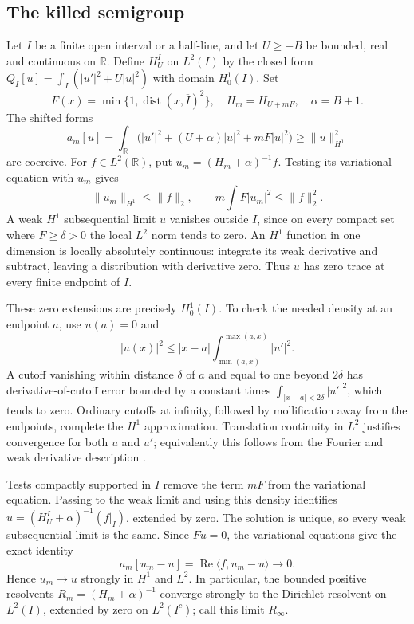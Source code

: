 \documentclass[11pt,a4paper]{article}
\newcommand{\R}{\mathbb R}
\begin{document}
\subsection*{The killed semigroup}
Let $I$ be a finite open interval or a half-line, and let $U\geq-B$ be
bounded, real and continuous on $\R$. Define $H_U^I$ on $L^2(I)$ by the
closed form $Q_I[u]=\int_I(|u'|^2+U|u|^2)$ with domain $H^1_0(I)$.
Set
\[
 F(x)=\min\{1,\operatorname{dist}(x,\overline I)^2\},\quad
 H_m=H_{U+mF},\quad \alpha=B+1.
\]
The shifted forms
\[
 a_m[u]=\int_\R\bigl(|u'|^2+(U+\alpha)|u|^2+mF|u|^2\bigr)
          \geq\|u\|_{H^1}^2
\]
are coercive. For $f\in L^2(\R)$, put $u_m=(H_m+\alpha)^{-1}f$.
Testing its variational equation with $u_m$ gives
\[
 \|u_m\|_{H^1}\leq\|f\|_2,\qquad
 m\int F|u_m|^2\leq\|f\|_2^2.
\]
A weak $H^1$ subsequential limit $u$ vanishes outside $\overline I$, since
on every compact set where $F\geq\delta>0$ the local $L^2$ norm tends to
zero. An $H^1$ function in one dimension is locally absolutely continuous:
integrate its weak derivative and subtract, leaving a distribution with
derivative zero. Thus $u$ has zero trace at every finite endpoint of $I$.

These zero extensions are precisely $H^1_0(I)$. To check the needed density
at an endpoint $a$, use $u(a)=0$ and
\[
 |u(x)|^2\leq |x-a|\int_{\min(a,x)}^{\max(a,x)}|u'|^2.
\]
A cutoff vanishing within distance $\delta$ of $a$ and equal to one beyond
$2\delta$ has derivative-of-cutoff error bounded by a constant times
$\int_{|x-a|<2\delta}|u'|^2$, which tends to zero. Ordinary cutoffs at
infinity, followed by mollification away from the endpoints, complete the
$H^1$ approximation. Translation continuity in $L^2$ justifies convergence
for both $u$ and $u'$; equivalently this follows from the Fourier and weak
derivative description \cite[Section 7.1, (7.12)--(7.15)]{Teschl}.

Tests compactly supported in $I$ remove the term $mF$ from the variational
equation. Passing to the weak limit and using this density identifies
$u=(H_U^I+\alpha)^{-1}(f|_I)$, extended by zero. The solution is unique, so
every weak subsequential limit is the same. Since $Fu=0$, the variational
equations give the exact identity
\[
 a_m[u_m-u]=\operatorname{Re}\langle f,u_m-u\rangle\longrightarrow0.
\]
Hence $u_m\to u$ strongly in $H^1$ and $L^2$. In particular, the bounded
positive resolvents $R_m=(H_m+\alpha)^{-1}$ converge strongly to the
Dirichlet resolvent on $L^2(I)$, extended by zero on $L^2(I^c)$; call this
limit $R_\infty$.
\end{document}
